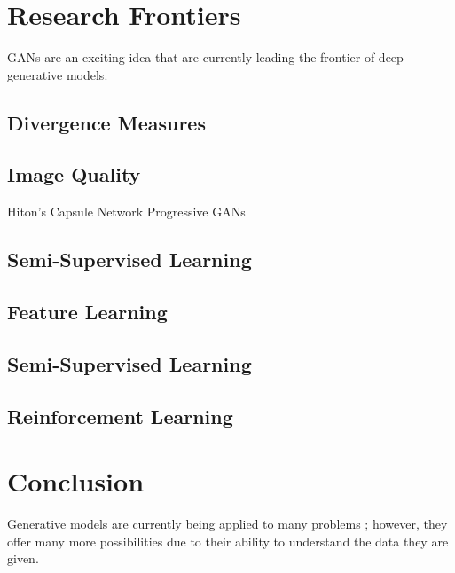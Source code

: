 \documentclass[11pt]{article}
\begin{document}
\section{Research Frontiers}
GANs are an exciting idea that are currently leading the frontier of deep generative models.

\subsection{Divergence Measures}
\subsection{Image Quality}
Hiton's Capsule Network
Progressive GANs

\subsection{Semi-Supervised Learning}
\subsection{Feature Learning}
\subsection{Semi-Supervised Learning}
\subsection{Reinforcement Learning}


\section{Conclusion}
Generative models are currently being applied to many problems \citep{genmodelingopenai}; however, they offer many more possibilities due to their ability to understand the data they are given.



\end{document}
